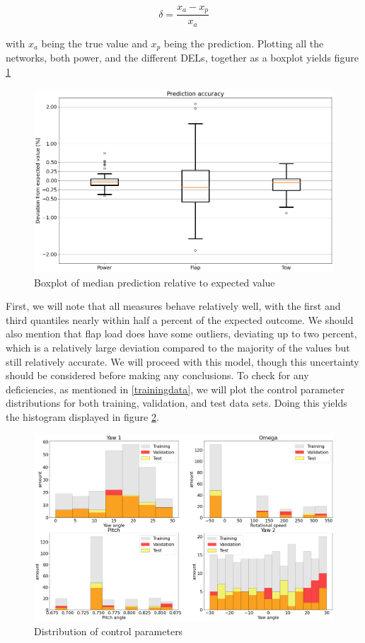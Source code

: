 \begin{equation}
    \delta = \frac{x_a-x_p}{x_a}
\end{equation}

with $x_a$ being the true value and $x_p$ being the prediction. Plotting all the networks, both power, and the different DELs, together as a boxplot yields figure \ref{fig:boxplotacc}

\begin{figure}[H]
    \centering
    \includegraphics[scale=0.34]{Illustrations/boxplotaccuracy.png}
    \caption{Boxplot of median prediction relative to expected value}
    \label{fig:boxplotacc}
\end{figure}

First, we will note that all measures behave relatively well, with the first and third quantiles nearly within half a percent of the expected outcome. We should also mention that flap load does have some outliers, deviating up to two percent, which is a relatively large deviation compared to the majority of the values but still relatively accurate. We will proceed with this model, though this uncertainty should be considered before making any conclusions. To check for any deficiencies, as mentioned in \ref{trainingdata}, we will plot the control parameter distributions for both training, validation, and test data sets. Doing this yields the histogram displayed in figure \ref{fig:controlparameterdistribution}.

\begin{figure}[H]
    \centering
    \includegraphics[scale=0.21]{Illustrations/controldistribution.png}
    \caption{Distribution of control parameters}
    \label{fig:controlparameterdistribution}
\end{figure}

